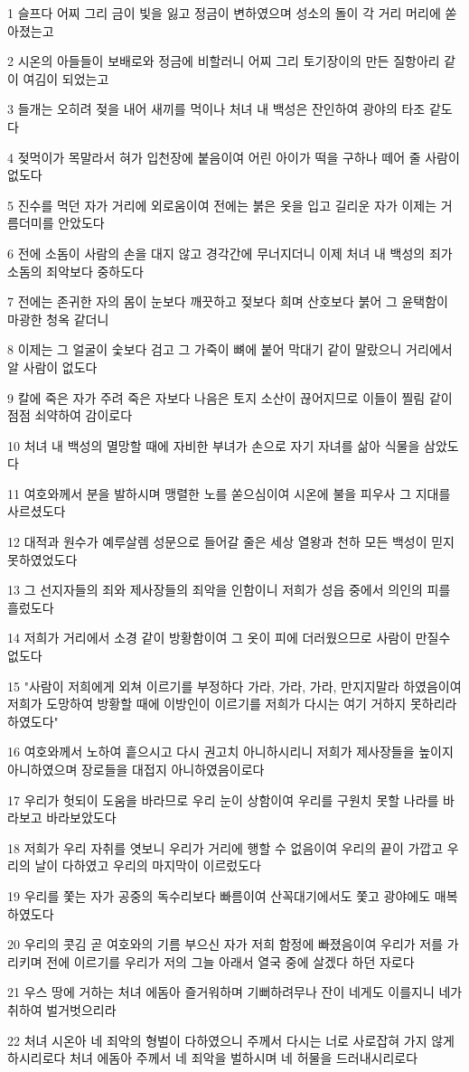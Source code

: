 \par 1 슬프다 어찌 그리 금이 빛을 잃고 정금이 변하였으며 성소의 돌이 각 거리 머리에 쏟아졌는고
\par 2 시온의 아들들이 보배로와 정금에 비할러니 어찌 그리 토기장이의 만든 질항아리 같이 여김이 되었는고
\par 3 들개는 오히려 젖을 내어 새끼를 먹이나 처녀 내 백성은 잔인하여 광야의 타조 같도다
\par 4 젖먹이가 목말라서 혀가 입천장에 붙음이여 어린 아이가 떡을 구하나 떼어 줄 사람이 없도다
\par 5 진수를 먹던 자가 거리에 외로움이여 전에는 붉은 옷을 입고 길리운 자가 이제는 거름더미를 안았도다
\par 6 전에 소돔이 사람의 손을 대지 않고 경각간에 무너지더니 이제 처녀 내 백성의 죄가 소돔의 죄악보다 중하도다
\par 7 전에는 존귀한 자의 몸이 눈보다 깨끗하고 젖보다 희며 산호보다 붉어 그 윤택함이 마광한 청옥 같더니
\par 8 이제는 그 얼굴이 숯보다 검고 그 가죽이 뼈에 붙어 막대기 같이 말랐으니 거리에서 알 사람이 없도다
\par 9 칼에 죽은 자가 주려 죽은 자보다 나음은 토지 소산이 끊어지므로 이들이 찔림 같이 점점 쇠약하여 감이로다
\par 10 처녀 내 백성의 멸망할 때에 자비한 부녀가 손으로 자기 자녀를 삶아 식물을 삼았도다
\par 11 여호와께서 분을 발하시며 맹렬한 노를 쏟으심이여 시온에 불을 피우사 그 지대를 사르셨도다
\par 12 대적과 원수가 예루살렘 성문으로 들어갈 줄은 세상 열왕과 천하 모든 백성이 믿지 못하였었도다
\par 13 그 선지자들의 죄와 제사장들의 죄악을 인함이니 저희가 성읍 중에서 의인의 피를 흘렀도다
\par 14 저희가 거리에서 소경 같이 방황함이여 그 옷이 피에 더러웠으므로 사람이 만질수 없도다
\par 15 "사람이 저희에게 외쳐 이르기를 부정하다 가라, 가라, 가라, 만지지말라 하였음이여 저희가 도망하여 방황할 때에 이방인이 이르기를 저희가 다시는 여기 거하지 못하리라 하였도다"
\par 16 여호와께서 노하여 흩으시고 다시 권고치 아니하시리니 저희가 제사장들을 높이지 아니하였으며 장로들을 대접지 아니하였음이로다
\par 17 우리가 헛되이 도움을 바라므로 우리 눈이 상함이여 우리를 구원치 못할 나라를 바라보고 바라보았도다
\par 18 저희가 우리 자취를 엿보니 우리가 거리에 행할 수 없음이여 우리의 끝이 가깝고 우리의 날이 다하였고 우리의 마지막이 이르렀도다
\par 19 우리를 쫓는 자가 공중의 독수리보다 빠름이여 산꼭대기에서도 쫓고 광야에도 매복하였도다
\par 20 우리의 콧김 곧 여호와의 기름 부으신 자가 저희 함정에 빠졌음이여 우리가 저를 가리키며 전에 이르기를 우리가 저의 그늘 아래서 열국 중에 살겠다 하던 자로다
\par 21 우스 땅에 거하는 처녀 에돔아 즐거워하며 기뻐하려무나 잔이 네게도 이를지니 네가 취하여 벌거벗으리라
\par 22 처녀 시온아 네 죄악의 형벌이 다하였으니 주께서 다시는 너로 사로잡혀 가지 않게 하시리로다 처녀 에돔아 주께서 네 죄악을 벌하시며 네 허물을 드러내시리로다

